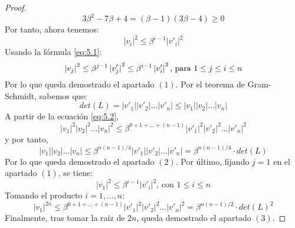 \begin{proof}
        \begin{equation}
            3\beta^{2} - 7\beta + 4 = (\beta -1)(3\beta-4) \geq 0
        \end{equation}
        Por tanto, ahora tenemos:
        \begin{equation} \label{eq:5.2}
            \left| v_{i} \right|^{2} \leq \beta^{i-1} \left| v'_{i} \right|^{2}
        \end{equation}
        Usando la fórmula \eqref{eq:5.1}:
        \begin{equation}
            \left| v_{j} \right|^{2} \leq \beta^{j-1} \left| \smash[b]{v'_{j}} \right|^{2} \leq \beta^{i-1} \left| v'_{i} \right|^{2} \text{, para } 1 \leq j \leq i \leq n
        \end{equation}
        Por lo que queda demostrado el apartado $(1)$. Por el teorema de Gram-Schmidt, sabemos que:
        \begin{equation}
            det(L) = \left| v'_{1} \right| \left| v'_{2} \right| \hdots \left| v'_{n} \right| \leq \left| v_{1} \right| \left| v_{2} \right| \hdots \left| v_{n} \right|
        \end{equation}
        A partir de la ecuación \eqref{eq:5.2},
        \begin{equation}
            \left| v_{1} \right|^{2} \left| v_{2} \right|^{2} \hdots \left| v_{n} \right|^{2} \leq \beta^{0 + 1 + \hdots + (n-1)} \left| v'_{1} \right|^{2} \left| v'_{2} \right|^{2} \hdots \left| v'_{n} \right|^{2}
        \end{equation}
        y por tanto,
        \begin{equation}
            \left| v_{1} \right| \left| v_{2} \right| \hdots \left| v_{n} \right| \leq \beta^{n(n-1)/4} \left| v'_{1} \right| \left| v'_{2} \right| \hdots \left| v'_{n} \right| = \beta^{n(n-1)/4} \cdot det(L)
        \end{equation}
        Por lo que queda demostrado el apartado $(2)$. Por último, fijando $j = 1$ en el apartado $(1)$, se tiene:
        \begin{equation}
            \left| v_{1} \right|^{2} \leq \beta^{i-1} \left| v'_{i} \right|^{2} \text{, con } 1 \leq i \leq n
        \end{equation}
        Tomando el producto $i = 1, ... , n$:
        \begin{equation}
            \left| v_{1} \right|^{2n} \leq \beta^{0 + 1 + \hdots + (n-1)} \left| v'_{1} \right|^{2} \left| v'_{2} \right|^{2} \hdots \left| v'_{n} \right|^{2} = \beta^{n(n-1)/2} \cdot det(L)^{2}
        \end{equation}
        Finalmente, tras tomar la raiz de $2n$, queda demostrado el apartado $(3)$.
    \end{proof}

